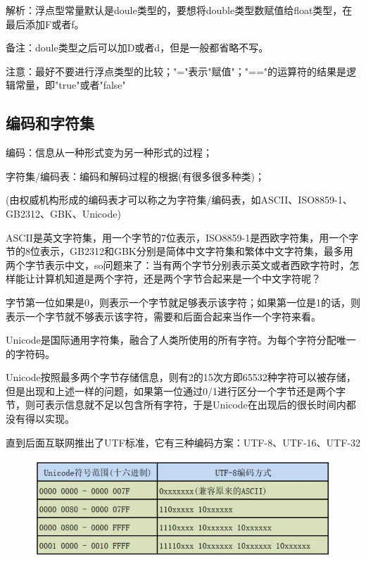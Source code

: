 \documentclass{article}
\begin{document}
	解析：浮点型常量默认是doule类型的，要想将double类型数赋值给float类型，在最后添加F或者f。
	
	备注：doule类型之后可以加D或者d，但是一般都省略不写。
	
	注意：最好不要进行浮点类型的比较；"="表示"赋值"；"=="的运算符的结果是逻辑常量，即"true"或者"false"
	
	\subsection{编码和字符集}
	
	编码：信息从一种形式变为另一种形式的过程；
	
	字符集/编码表：编码和解码过程的根据(有很多很多种类)；
	
	(由权威机构形成的编码表才可以称之为字符集/编码表，如ASCII、ISO8859-1、GB2312、GBK、Unicode)
	
	ASCII是英文字符集，用一个字节的7位表示，ISO8859-1是西欧字符集，用一个字节的8位表示，GB2312和GBK分别是简体中文字符集和繁体中文字符集，最多用两个字节表示中文，so问题来了：当有两个字节分别表示英文或者西欧字符时，怎样能让计算机知道是两个字符，还是两个字节合起来是一个中文字符呢？
	
	字节第一位如果是0，则表示一个字节就足够表示该字符；如果第一位是1的话，则表示一个字节就不够表示该字符，需要和后面合起来当作一个字符来看。
	
	Unicode是国际通用字符集，融合了人类所使用的所有字符。为每个字符分配唯一的字符码。
	
	Unicode按照最多两个字节存储信息，则有2的15次方即65532种字符可以被存储，但是出现和上述一样的问题，如果第一位通过0/1进行区分一个字节还是两个字节，则可表示信息就不足以包含所有字符，于是Unicode在出现后的很长时间内都没有得以实现。
	
	直到后面互联网推出了UTF标准，它有三种编码方案：UTF-8、UTF-16、UTF-32
	
	
	
	\begin{figure}[ht]
		\centering
		\includegraphics[width=120mm]{08.png}
	\end{figure}
	
\end{document}

